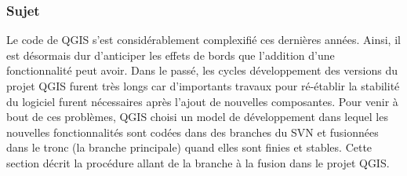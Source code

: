 \subsubsection{Sujet}

Le code de QGIS s'est consid\'erablement complexifi\'e ces derni\`eres ann\'ees. Ainsi, il est d\'esormais dur d'anticiper les effets de bords que l'addition d'une fonctionnalit\'e peut avoir. Dans le pass\'e, les cycles d\'eveloppement des versions du projet QGIS furent tr\`es longs car d'importants travaux pour r\'e-\'etablir la stabilit\'e du logiciel furent n\'ecessaires apr\`es l'ajout de nouvelles composantes. Pour venir \`a bout de ces probl\`emes, QGIS choisi un model de d\'eveloppement dans lequel les nouvelles fonctionnalit\'es sont cod\'ees dans des branches du SVN et fusionn\'ees dans le tronc (la branche principale) quand elles sont finies et stables. Cette section d\'ecrit la proc\'edure allant de la branche \`a la fusion dans le projet QGIS. 

